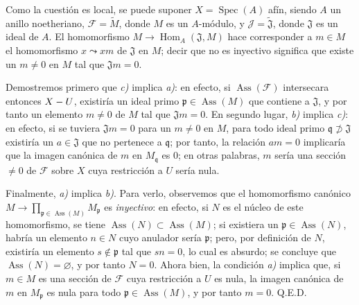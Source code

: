Como la cuestión es local, se puede suponer $X=\operatorname{Spec}(A)$ afín,
siendo $A$ un anillo noetheriano, $\mathcal F=\widetilde M$, donde $M$ es un
$A$-módulo, y $\mathcal J=\widetilde{\mathfrak J}$, donde $\mathfrak J$ es un
ideal de $A$. El homomorfismo $M\to\operatorname{Hom}_A(\mathfrak J,M)$ hace
corresponder a $m\in M$ el homomorfismo $x\leadsto xm$ de $\mathfrak J$ en
$M$; decir que no es inyectivo significa que existe un $m\ne0$ en $M$ tal que
$\mathfrak Jm=0$.

Demostremos primero que \emph{c)} implica \emph{a)}: en efecto, si
$\operatorname{Ass}(\mathcal F)$ intersecara entonces $X- U$, existiría un
ideal primo $\mathfrak p\in\operatorname{Ass}(M)$ que contiene a
$\mathfrak J$, y por tanto un elemento $m\ne0$ de $M$ tal que
$\mathfrak Jm=0$. En segundo lugar, \emph{b)} implica \emph{c)}: en efecto,
si se tuviera $\mathfrak Jm=0$ para un $m\ne0$ en $M$, para todo ideal primo
$\mathfrak q\not\supset\mathfrak J$ existiría un $a\in\mathfrak J$ que no
pertenece a $\mathfrak q$; por tanto, la relación $am=0$ implicaría que la
imagen canónica de $m$ en $M_\mathfrak q$ es $0$; en otras palabras, $m$
sería una sección $\ne0$ de $\mathcal F$ sobre $X$ cuya restricción a $U$
sería nula.

Finalmente, \emph{a)} implica \emph{b)}. Para verlo, observemos que el
homomorfismo canónico
$M\longrightarrow\prod_{\mathfrak p\in\operatorname{Ass}(M)}M_\mathfrak p$
es \emph{inyectivo}: en efecto, si $N$ es el núcleo de este homomorfismo, se
tiene $\operatorname{Ass}(N)\subset\operatorname{Ass}(M)$; si existiera un
$\mathfrak p\in\operatorname{Ass}(N)$, habría un elemento $n\in N$ cuyo
anulador sería $\mathfrak p$; pero, por definición de $N$, existiría un
elemento $s\notin\mathfrak p$ tal que $sn=0$, lo cual es absurdo; se concluye
que $\operatorname{Ass}(N)=\varnothing$, y por tanto $N=0$. Ahora bien, la
condición \emph{a)} implica que, si $m\in M$ es una sección de $\mathcal F$
cuya restricción a $U$ es nula, la imagen canónica de $m$ en
$M_\mathfrak p$ es nula para todo $\mathfrak p\in\operatorname{Ass}(M)$, y
por tanto $m=0$. Q.E.D.

